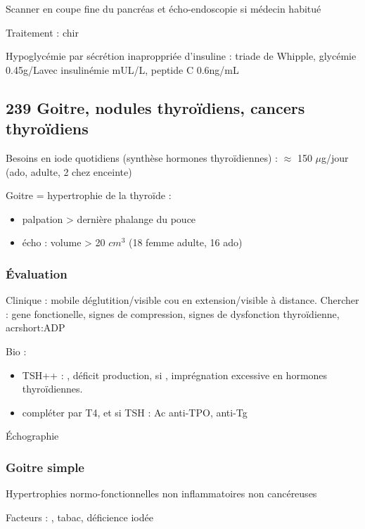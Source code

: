 \documentclass[11pt]{article}
\begin{document}
Scanner en coupe fine du pancréas et écho-endoscopie si médecin habitué

Traitement : chir

\begin{tcolorbox}
Hypoglycémie par sécrétion inaproppriée d'insuline : triade de Whipple, glycémie \le 0.45g/L\footnotemark avec
insulinémie  mUL/L, peptide C \ge 0.6ng/mL
\end{tcolorbox}

\subsection{239 \textdagger{} Goitre, nodules thyroïdiens, cancers thyroïdiens}
\label{sec:org01c05c5}
Besoins en iode quotidiens (synthèse hormones thyroïdiennes) :  \(\approx\) 150 \(\mu\)g/jour (ado,
  adulte, \texttimes{} 2 chez enceinte)

Goitre = hypertrophie de la thyroïde :
\begin{itemize}
\item palpation > dernière phalange du pouce
\item écho : volume > 20 \(cm^3\) (18 femme adulte, 16 ado)
\end{itemize}

\subsubsection{Évaluation}
\label{sec:orgd843321}
Clinique : mobile déglutition/visible cou en extension/visible à
distance. Chercher : gene fonctionelle, signes de compression, signes de
dysfonction thyroïdienne, acrshort:ADP

Bio : 
\begin{itemize}
\item TSH++ : \inc, déficit production, si \dec, imprégnation excessive en hormones thyroïdiennes.
\item compléter par T4, et si TSH \inc : Ac anti-TPO, anti-Tg
\end{itemize}

Échographie

\subsubsection{Goitre simple}
\label{sec:orgb1484af}
Hypertrophies normo-fonctionnelles non inflammatoires non cancéreuses

Facteurs : \female, tabac, déficience iodée
\end{document}
